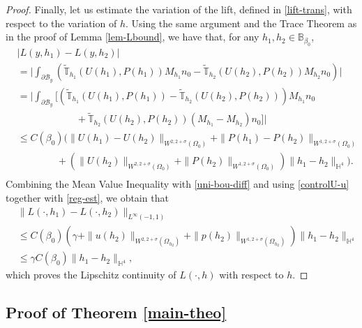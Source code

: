 \documentclass[11pt,a4paper]{amsart}
\theoremstyle{remark}
\theoremstyle{definition}
\numberwithin{equation}{section}
\numberwithin{proposition}{section}
\begin{document}
\begin{proof}
Finally, let us estimate the variation of the lift, defined in \eqref{lift-trans}, with respect to the variation of $h$. Using the same argument and the Trace Theorem as in the proof of Lemma \ref{lem-Lbound}, we have that,  for any $h_1,h_2\in \mathbb{B}_{\beta_0}$,
\begin{equation}\label{diff-lift}\begin{aligned}
&|	L(y, h_1) - 	L(y, h_2) |\\[5pt]&=
\bigg|\int_{\partial \mathcal{B}_y}  \left(\widetilde{\mathbb{T}}_{h_1}(U(h_1), P(h_1)) M_{h_1}n_0 - \widetilde{\mathbb{T}}_{h_2}(U(h_2), P(h_2)) M_{h_2}n_0\right) \bigg|
\\[5pt]&
=\bigg| \int_{\partial \mathcal{B}_y}\bigg[\left(\widetilde{\mathbb{T}}_{h_1}(U(h_1),P(h_1)) - \widetilde{\mathbb{T}}_{h_2}(U(h_2),P(h_2)) \right) M_{h_1}n_0 \\[2pt]&\qquad \qquad\qquad  +\widetilde{\mathbb{T}}_{h_2}(U(h_2),P(h_2)) (M_{h_1} - M_{h_2})n_0\bigg]\bigg|\\[5pt]&
\leq C(\beta_0)\bigg(\|U(h_1)- U(h_2)\|_{W^{2, 2+\sigma}(\Omega_0)}+ \|P(h_1)-P(h_2)\|_{W^{1, 2+\sigma}(\Omega_0)} \\[2pt]&\qquad\qquad  +\left(\|U(h_2)\|_{W^{2,2+\sigma}(\Omega_0)}+ \|P(h_2)\|_{W^{1, 2+\sigma}(\Omega_0)}\right)\|h_1-h_2\|_{\mathbb{H}^4}\bigg).\\[5pt]
\end{aligned}
\end{equation}
 Combining the Mean Value Inequality with \eqref{uni-bou-diff} and using \eqref{controlU-u} together with \eqref{reg-est}, we obtain that
\begin{equation*}\begin{aligned} &\|	L(\cdot, h_1) - 	L(\cdot, h_2) \|_{L^\infty(-1,1)}\\[5pt]&\leq C(\beta_0)\left(\gamma + \|u(h_2)\|_{W^{2, 2+\sigma}(\Omega_{h_2})}+ \|p(h_2)\|_{W^{1, 2+\sigma}(\Omega_{h_2})}\right)\|h_1-h_2\|_{\mathbb{H}^4}\\[5pt]&\leq \gamma C(\beta_0)\|h_1-h_2\|_{\mathbb{H}^4},
\end{aligned}
\end{equation*} which proves the Lipschitz continuity of $L(\cdot, h)$ with respect to $h$.
\end{proof}

\subsection{Proof of Theorem \ref{main-theo}}\label{sec-proof}
\end{document}
